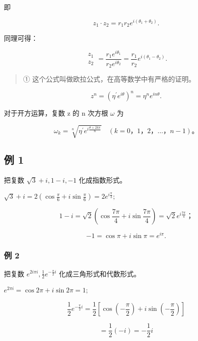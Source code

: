 即

\[
z _ {1} \cdot z _ {2} = r _ {1} r _ {2} e ^ {i (\theta_ {1} + \theta_ {2})}.
\]

同理可得：

\[
\boxed { \begin{array}{l} z _ {1} \\ z _ {2} \end{array} } = \frac {r _ {1} e ^ {i \theta_ {1}}}{r _ {2} e ^ {i \theta_ {2}}} = \frac {r _ {1}}{r _ {2}} e ^ {i (\theta_ {1} - \theta_ {2})}.
\]

\begin{quote}
① 这个公式叫做欧拉公式，在高等数学中有严格的证明。
\end{quote}

\[
z ^ {n} = \left(\eta^ {\prime} e ^ {i \theta}\right) ^ {n} = \eta^ {n} e ^ {i n \theta}.
\]

对于开方运算，复数 z 的 n 次方根 \(\omega\) 为

\[
\omega_ {k} = \sqrt [ n ]{\eta^ {\prime} e ^ {i \frac {\theta + 2 k \pi}{n}}} \quad (k = 0\text{，} 1\text{，} 2\text{，} \dots \text{，} n - 1)\text{。}
\]

\subsection{例 1}

把复数 \(\sqrt{3} + i, 1 - i, -1\) 化成指数形式。

\(\sqrt{3} + i = 2\left(\cos \frac{\pi}{6} + i \sin \frac{\pi}{6}\right) = 2e^{i\frac{\pi}{3}};\)

\[
1 - i = \sqrt {2} \left(\cos \frac {7 \pi}{4} + i \sin \frac {7 \pi}{4}\right) = \sqrt {2} e ^ {i \frac {7 \pi}{4}}\text{；}
\]

\[
- 1 = \cos \pi + i \sin \pi = e ^ {i \pi}.
\]

\subsubsection{例 2}

把复数 \(e^{2i\pi i}, \frac{1}{2} e^{-\frac{\pi}{2} i}\)
化成三角形式和代数形式。

 \(e^{2\pi i} = \cos 2\pi + i\sin 2\pi = 1;\)

\[
\frac {1}{2} e ^ {- \frac {\pi}{2} i} = \frac {1}{2} \left[ \cos \left(- \frac {\pi}{2}\right) + i \sin \left(- \frac {\pi}{2}\right) \right]
\]

\[
= \frac {1}{2} (- i) = - \frac {1}{2} i
\]

